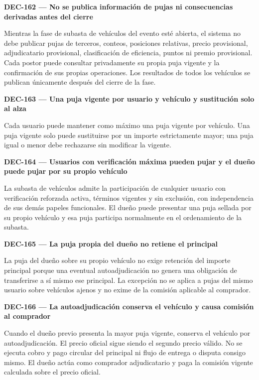 \documentclass[10pt,letterpaper]{article}
\begin{document}
\noindent\textbf{DEC-162 --- No se publica información de pujas ni consecuencias derivadas antes del cierre}\par
Mientras la fase de subasta de vehículos del evento esté abierta, el sistema no debe publicar pujas de terceros, conteos, posiciones relativas, precio provisional, adjudicatario provisional, clasificación de eficiencia, puntos ni premio provisional. Cada postor puede consultar privadamente su propia puja vigente y la confirmación de sus propias operaciones. Los resultados de todos los vehículos se publican únicamente después del cierre de la fase.\par\vspace{0.45em}
\noindent\textbf{DEC-163 --- Una puja vigente por usuario y vehículo y sustitución solo al alza}\par
Cada usuario puede mantener como máximo una puja vigente por vehículo. Una puja vigente solo puede sustituirse por un importe estrictamente mayor; una puja igual o menor debe rechazarse sin modificar la vigente.\par\vspace{0.45em}
\noindent\textbf{DEC-164 --- Usuarios con verificación máxima pueden pujar y el dueño puede pujar por su propio vehículo}\par
La subasta de vehículos admite la participación de cualquier usuario con verificación reforzada activa, términos vigentes y sin exclusión, con independencia de sus demás papeles funcionales. El dueño puede presentar una puja sellada por su propio vehículo y esa puja participa normalmente en el ordenamiento de la subasta.\par\vspace{0.45em}
\noindent\textbf{DEC-165 --- La puja propia del dueño no retiene el principal}\par
La puja del dueño sobre su propio vehículo no exige retención del importe principal porque una eventual autoadjudicación no genera una obligación de transferirse a sí mismo ese principal. La excepción no se aplica a pujas del mismo usuario sobre vehículos ajenos y no exime de la comisión aplicable al comprador.\par\vspace{0.45em}
\noindent\textbf{DEC-166 --- La autoadjudicación conserva el vehículo y causa comisión al comprador}\par
Cuando el dueño previo presenta la mayor puja vigente, conserva el vehículo por autoadjudicación. El precio oficial sigue siendo el segundo precio válido. No se ejecuta cobro y pago circular del principal ni flujo de entrega o disputa consigo mismo. El dueño actúa como comprador adjudicatario y paga la comisión vigente calculada sobre el precio oficial.\par\vspace{0.45em}
\end{document}
